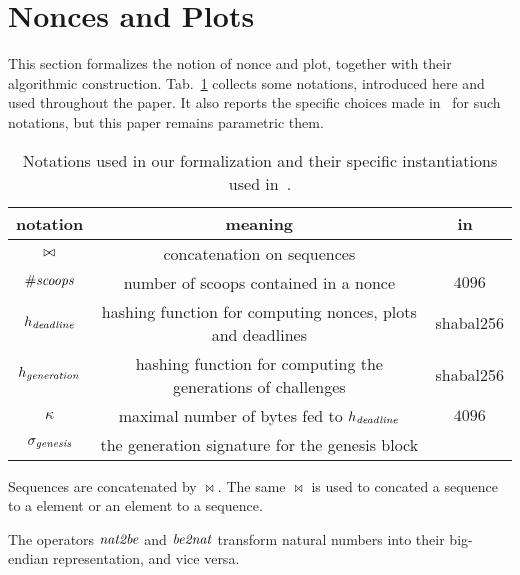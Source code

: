 \section{Nonces and Plots}\label{sec:nonces_and_plots}

This section formalizes the notion of nonce and plot, together with their
algorithmic construction. Tab.~\ref{tab:notations} collects some notations,
introduced here and used throughout the paper.
It also reports the specific choices
made in~\cite{SignumPlotting} for such notations, but this paper remains parametric
\wrt them.

\begin{table}[t]
\begin{center}
\begin{tabular}{|c|c|c|}
  \hline
  \textbf{notation} & \textbf{meaning} & \textbf{in~\cite{SignumPlotting}}\\\hline\hline

  $\operatorname*{\bowtie}$ & concatenation on sequences & \\\hline
  ${\#\mathit{scoops}}$ & number of scoops contained in a nonce & $4096$\\\hline

  $h_{\mathit{deadline}}$ & hashing function for computing nonces, plots and deadlines & shabal256\\\hline

  $h_{\mathit{generation}}$ & hashing function for computing the generations of challenges & shabal256\\\hline

  $\kappa$ & maximal number of bytes fed to $h_{\mathit{deadline}}$ & $4096$\\\hline

  $\sigma_{\mathit{genesis}}$ & the generation signature for the genesis block & \\\hline
\end{tabular}
\end{center}
\caption{Notations used in our formalization and their specific instantiations
  used in~\cite{SignumPlotting}.}
\label{tab:notations}
\end{table}
%
\begin{definition}
  Sequences are concatenated by $\bowtie$. The same $\bowtie$
  is used to concated a sequence to a element or an element to a sequence.
\end{definition}
%
\begin{definition}
  The operators ${\mathit{nat2be}}$ and ${\mathit{be2nat}}$ transform natural numbers
  into their big-endian representation, and vice versa.
\end{definition}
